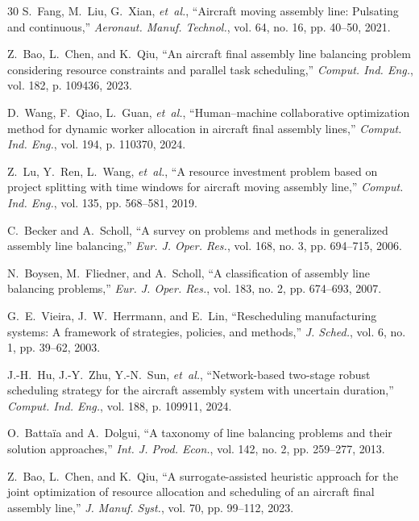 \documentclass[journal,10pt]{IEEEtran}
\begin{document}
\begin{thebibliography}{30}
S.~Fang, M.~Liu, G.~Xian, \textit{et~al.}, ``Aircraft moving assembly line: Pulsating and continuous,'' \textit{Aeronaut. Manuf. Technol.}, vol. 64, no. 16, pp. 40--50, 2021.

Z.~Bao, L.~Chen, and K.~Qiu, ``An aircraft final assembly line balancing problem considering resource constraints and parallel task scheduling,'' \textit{Comput. Ind. Eng.}, vol. 182, p. 109436, 2023.

D.~Wang, F.~Qiao, L.~Guan, \textit{et~al.}, ``Human--machine collaborative optimization method for dynamic worker allocation in aircraft final assembly lines,'' \textit{Comput. Ind. Eng.}, vol. 194, p. 110370, 2024.

Z.~Lu, Y.~Ren, L.~Wang, \textit{et~al.}, ``A resource investment problem based on project splitting with time windows for aircraft moving assembly line,'' \textit{Comput. Ind. Eng.}, vol. 135, pp. 568--581, 2019.

C.~Becker and A.~Scholl, ``A survey on problems and methods in generalized assembly line balancing,'' \textit{Eur. J. Oper. Res.}, vol. 168, no. 3, pp. 694--715, 2006.

N.~Boysen, M.~Fliedner, and A.~Scholl, ``A classification of assembly line balancing problems,'' \textit{Eur. J. Oper. Res.}, vol. 183, no. 2, pp. 674--693, 2007.

G.~E.~Vieira, J.~W.~Herrmann, and E.~Lin, ``Rescheduling manufacturing systems: A framework of strategies, policies, and methods,'' \textit{J. Sched.}, vol. 6, no. 1, pp. 39--62, 2003.

J.-H.~Hu, J.-Y.~Zhu, Y.-N.~Sun, \textit{et~al.}, ``Network-based two-stage robust scheduling strategy for the aircraft assembly system with uncertain duration,'' \textit{Comput. Ind. Eng.}, vol. 188, p. 109911, 2024.

O.~Batta\"ia and A.~Dolgui, ``A taxonomy of line balancing problems and their solution approaches,'' \textit{Int. J. Prod. Econ.}, vol. 142, no. 2, pp. 259--277, 2013.

Z.~Bao, L.~Chen, and K.~Qiu, ``A surrogate-assisted heuristic approach for the joint optimization of resource allocation and scheduling of an aircraft final assembly line,'' \textit{J. Manuf. Syst.}, vol. 70, pp. 99--112, 2023.


\end{thebibliography}
\end{document}
